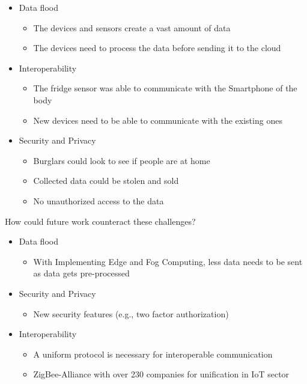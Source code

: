 \documentclass{article}
\begin{document}
\begin{itemize}
    \item Data flood
          \begin{itemize}
              \item The devices and sensors create a vast amount of data
              \item The devices need to process the data before sending it to the cloud
          \end{itemize}
    \item Interoperability
          \begin{itemize}
              \item The fridge sensor was able to communicate with the Smartphone of the body
              \item New devices need to be able to communicate with the existing ones
          \end{itemize}
    \item Security and Privacy
          \begin{itemize}
              \item Burglars could look to see if people are at home
              \item Collected data could be stolen and sold
              \item No unauthorized access to the data
          \end{itemize}
\end{itemize}
How could future work counteract these challenges?
\begin{itemize}
    \item Data flood
          \begin{itemize}
              \item With Implementing Edge and Fog Computing, less data needs to be sent as data gets pre-processed
          \end{itemize}
    \item Security and Privacy
          \begin{itemize}
              \item New security features (e.g., two factor authorization)
          \end{itemize}
    \item Interoperability
          \begin{itemize}
              \item A uniform protocol is necessary for interoperable communication
              \item ZigBee-Alliance with over 230 companies for unification in IoT sector
          \end{itemize}
\end{itemize}
\end{document}
